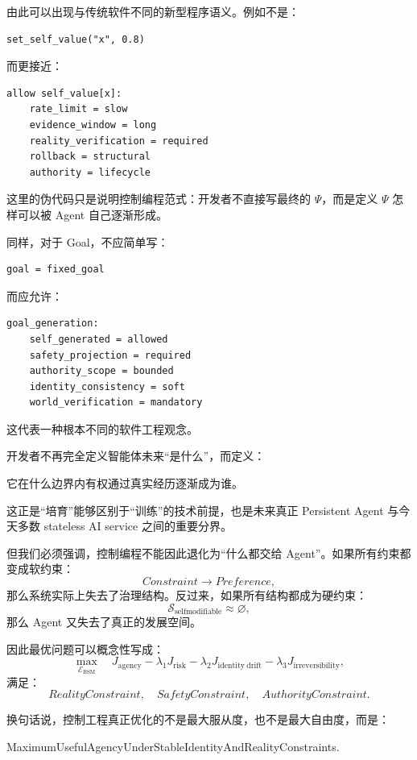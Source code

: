 由此可以出现与传统软件不同的新型程序语义。例如不是：

\begin{verbatim}
set_self_value("x", 0.8)
\end{verbatim}

而更接近：

\begin{verbatim}
allow self_value[x]:
    rate_limit = slow
    evidence_window = long
    reality_verification = required
    rollback = structural
    authority = lifecycle
\end{verbatim}

这里的伪代码只是说明控制编程范式：开发者不直接写最终的 $\Psi$，而是定义 $\Psi$ 怎样可以被 Agent 自己逐渐形成。

同样，对于 Goal，不应简单写：
\begin{verbatim}
goal = fixed_goal
\end{verbatim}
而应允许：
\begin{verbatim}
goal_generation:
    self_generated = allowed
    safety_projection = required
    authority_scope = bounded
    identity_consistency = soft
    world_verification = mandatory
\end{verbatim}

这代表一种根本不同的软件工程观念。

开发者不再完全定义智能体未来“是什么”，而定义：
\begin{definition*}
它在什么边界内有权通过真实经历逐渐成为谁。
\end{definition*}

这正是“培育”能够区别于“训练”的技术前提，也是未来真正 Persistent Agent 与今天多数 stateless AI service 之间的重要分界。

但我们必须强调，控制编程不能因此退化为“什么都交给 Agent”。如果所有约束都变成软约束：
\[
Constraint\rightarrow Preference,
\]
那么系统实际上失去了治理结构。反过来，如果所有结构都成为硬约束：
\[
\mathcal S_{\mathrm{selfmodifiable}}
\approx\varnothing,
\]
那么 Agent 又失去了真正的发展空间。

因此最优问题可以概念性写成：
\[
\max_{\mathcal E_{\mathrm{BSM}}}
\quad
J_{\mathrm{agency}}
-
\lambda_1J_{\mathrm{risk}}
-
\lambda_2J_{\mathrm{identity\ drift}}
-
\lambda_3J_{\mathrm{irreversibility}},
\]
满足：
\[
RealityConstraint,
\quad
SafetyConstraint,
\quad
AuthorityConstraint.
\]

换句话说，控制工程真正优化的不是最大服从度，也不是最大自由度，而是：
\begin{statementbox}
MaximumUsefulAgencyUnderStableIdentityAndRealityConstraints.
\end{statementbox}

